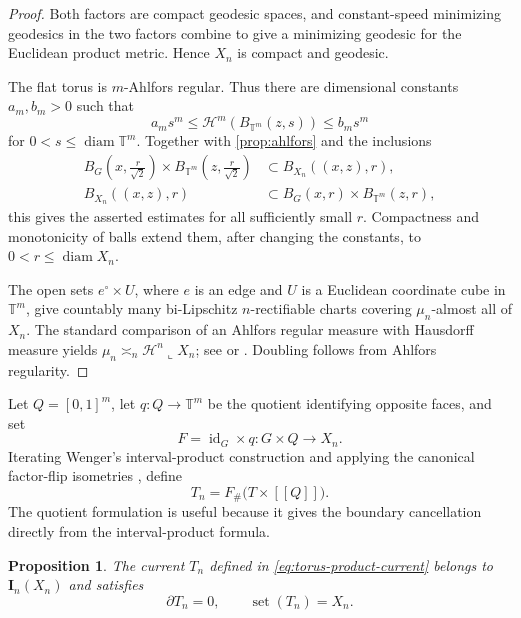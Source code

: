 \documentclass[11pt]{article}
\newtheorem{proposition}[theorem]{Proposition}
\theoremstyle{remark}
\newcommand{\I}{\mathbf I}
\newcommand{\Hh}{\mathcal H}
\newcommand{\set}{\operatorname{set}}
\newcommand{\diam}{\operatorname{diam}}
\newcommand{\llbracket}{[\![}
\newcommand{\rrbracket}{]\!]}
\begin{document}
\begin{proof}
Both factors are compact geodesic spaces, and constant-speed minimizing geodesics in the two factors combine to give a minimizing geodesic for the Euclidean product metric. Hence $X_n$ is compact and geodesic.

The flat torus is $m$-Ahlfors regular. Thus there are dimensional constants $a_m,b_m>0$ such that
\[
 a_m s^m\le
 \Hh^m(B_{\mathbb T^m}(z,s))
 \le b_m s^m
\]
for $0<s\le\diam\mathbb T^m$. Together with \cref{prop:ahlfors} and the inclusions
\[
\begin{aligned}
 B_G\!\left(x,\frac r{\sqrt2}\right)
 \times
 B_{\mathbb T^m}\!\left(z,\frac r{\sqrt2}\right)
 &\subset B_{X_n}((x,z),r),\\
 B_{X_n}((x,z),r)
 &\subset B_G(x,r)\times B_{\mathbb T^m}(z,r),
\end{aligned}
\]
this gives the asserted estimates for all sufficiently small $r$. Compactness and monotonicity of balls extend them, after changing the constants, to $0<r\le\diam X_n$.

The open sets $e^\circ\times U$, where $e$ is an edge and $U$ is a Euclidean coordinate cube in $\mathbb T^m$, give countably many bi-Lipschitz $n$-rectifiable charts covering $\mu_n$-almost all of $X_n$. The standard comparison of an Ahlfors regular measure with Hausdorff measure yields $\mu_n\asymp_n\Hh^n\llcorner X_n$; see \cite[Chapter~8]{Heinonen01} or \cite{AmbrosioTilli04}. Doubling follows from Ahlfors regularity.
\end{proof}

Let $Q=[0,1]^m$, let $q:Q\to\mathbb T^m$ be the quotient identifying opposite faces, and set
\[
       F=\operatorname{id}_G\times q:G\times Q\longrightarrow X_n.
\]
Iterating Wenger's interval-product construction and applying the canonical factor-flip isometries \cite[Section 3.1, Theorem 3.2]{Wenger07}, define
\begin{equation}\label{eq:torus-product-current}
       T_n=F_\#\bigl(T\times\llbracket Q\rrbracket\bigr).
\end{equation}
The quotient formulation is useful because it gives the boundary cancellation directly from the interval-product formula.

\begin{proposition}\label{prop:product-current}
The current $T_n$ defined in \eqref{eq:torus-product-current} belongs to $\I_n(X_n)$ and satisfies
\[
       \partial T_n=0,
       \qquad
       \set(T_n)=X_n.
\]
\end{proposition}
\end{document}
